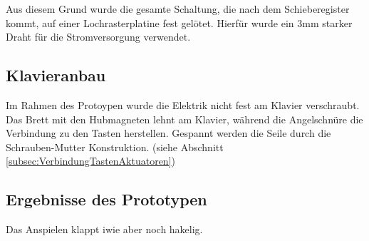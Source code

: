 Aus diesem Grund wurde die gesamte Schaltung, die nach dem Schieberegister kommt, auf einer Lochrasterplatine fest gelötet.
Hierfür wurde ein 3mm starker Draht für die Stromversorgung verwendet.

\subsection{Klavieranbau}
Im Rahmen des Protoypen wurde die Elektrik nicht fest am Klavier verschraubt.
Das Brett mit den Hubmagneten lehnt am Klavier, während die Angelschnüre die Verbindung zu den Tasten herstellen.
Gespannt werden die Seile durch die Schrauben-Mutter Konstruktion. (siehe Abschnitt \ref{subsec:VerbindungTastenAktuatoren})

\subsection{Ergebnisse des Prototypen}

Das Anspielen klappt iwie aber noch hakelig.


